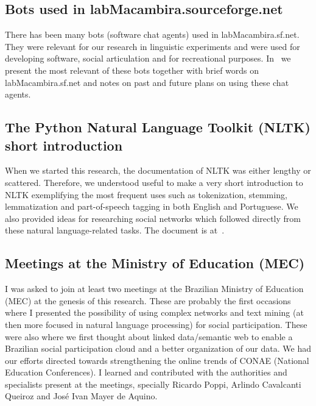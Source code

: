 \begin{apendicesenv}
\subsection{Bots used in labMacambira.sourceforge.net}
There has been many bots (software chat agents) used in labMacambira.sf.net.
They were relevant for our research in linguistic experiments and were used
for developing software, social articulation and for recreational purposes.
In~\cite{trabBots} we present the most relevant of these bots together with
brief words on labMacambira.sf.net and notes on past and future plans on using
these chat agents.

\subsection{The Python Natural Language Toolkit (NLTK) short introduction}
When we started this research, the documentation of NLTK was either lengthy or
scattered.
Therefore, we understood useful to make a very short introduction to NLTK
exemplifying the most frequent uses such as tokenization, stemming, lemmatization and
part-of-speech tagging in both English and Portuguese.
We also provided ideas for researching social networks which followed directly from
these natural language-related tasks.
The document is at~\cite{trabNLTK}.

\subsection{Meetings at the Ministry of Education (MEC)}
I was asked to join at least two meetings at the Brazilian Ministry of Education (MEC)
at the genesis of this research.
These are probably the first occasions where I presented the possibility of using
complex networks and text mining (at then more focused in natural language processing)
for social participation.
These were also where we first thought about linked data/semantic web to enable a
Brazilian social participation cloud and a better organization of our data.
We had our efforts directed towards strengthening the online trends of CONAE (National Education Conferences).
I learned and contributed with the authorities and specialists present at the meetings,
specially Ricardo Poppi, Arlindo Cavalcanti Queiroz and José Ivan Mayer de Aquino.


\end{apendicesenv}
